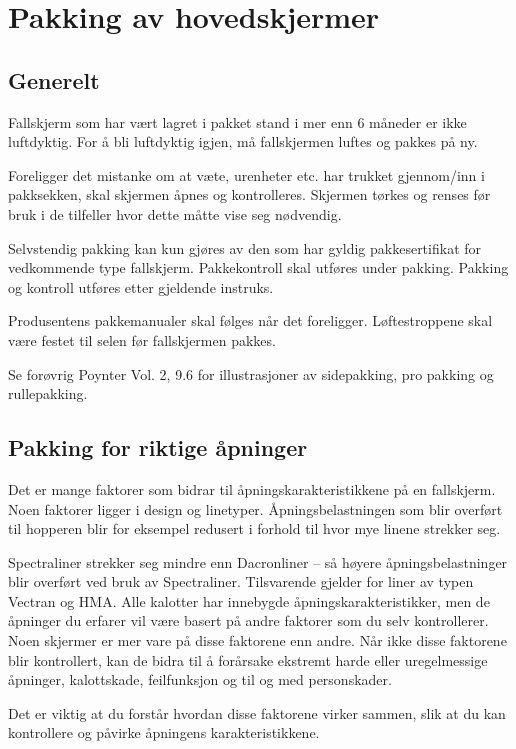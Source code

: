 \section{Pakking av hovedskjermer}
\subsection{Generelt}
Fallskjerm som har vært lagret i pakket stand i mer enn 6 måneder er ikke luftdyktig. For å bli luftdyktig igjen, må fallskjermen luftes og pakkes på ny.

Foreligger det mistanke om at væte, urenheter etc. har trukket gjennom/inn i pakksekken, skal skjermen åpnes og kontrolleres. Skjermen tørkes og renses før bruk i de tilfeller hvor dette måtte vise seg nødvendig.

Selvstendig pakking kan kun gjøres av den som har gyldig pakkesertifikat for vedkommende type fallskjerm. Pakkekontroll skal utføres under pakking. Pakking og kontroll utføres etter gjeldende instruks.

Produsentens pakkemanualer skal følges når det foreligger. Løftestroppene skal være festet til selen før fallskjermen pakkes.

Se forøvrig Poynter Vol. 2, 9.6 for illustrasjoner av sidepakking, pro pakking og rullepakking.

\subsection{Pakking for riktige åpninger}
Det er mange faktorer som bidrar til åpningskarakteristikkene på en fallskjerm. Noen faktorer ligger i design og linetyper. Åpningsbelastningen som blir overført til hopperen blir for eksempel redusert i forhold til hvor mye linene strekker seg.

Spectraliner strekker seg mindre enn Dacronliner – så høyere åpningsbelastninger blir overført ved bruk av Spectraliner. Tilsvarende gjelder for liner av typen Vectran og HMA. Alle kalotter har innebygde åpningskarakteristikker, men de åpninger du erfarer vil være basert på andre faktorer som du selv kontrollerer. Noen skjermer er mer vare på disse faktorene enn andre. Når ikke disse faktorene blir kontrollert, kan de bidra til å forårsake ekstremt harde eller uregelmessige åpninger, kalottskade, feilfunksjon og til og med personskader.

Det er viktig at du forstår hvordan disse faktorene virker sammen, slik at du kan kontrollere og påvirke åpningens karakteristikkene.


